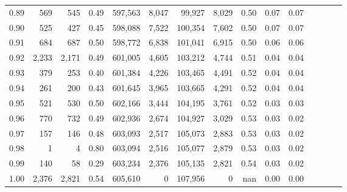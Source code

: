 \begin{tabular}{rrrcrrrrrrrrrrr}
0.89 &     569 &    545 &                                       0.49 &  597,563 &    8,047 &   99,927 &    8,029 &  0.50 &  0.07 &                         0.07 \\
0.90 &     525 &    427 &                                       0.45 &  598,088 &    7,522 &  100,354 &    7,602 &  0.50 &  0.07 &                         0.07 \\
0.91 &     684 &    687 &                                       0.50 &  598,772 &    6,838 &  101,041 &    6,915 &  0.50 &  0.06 &                         0.06 \\
0.92 &   2,233 &  2,171 &                                       0.49 &  601,005 &    4,605 &  103,212 &    4,744 &  0.51 &  0.04 &                         0.04 \\
0.93 &     379 &    253 &                                       0.40 &  601,384 &    4,226 &  103,465 &    4,491 &  0.52 &  0.04 &                         0.04 \\
0.94 &     261 &    200 &                                       0.43 &  601,645 &    3,965 &  103,665 &    4,291 &  0.52 &  0.04 &                         0.04 \\
0.95 &     521 &    530 &                                       0.50 &  602,166 &    3,444 &  104,195 &    3,761 &  0.52 &  0.03 &                         0.03 \\
0.96 &     770 &    732 &                                       0.49 &  602,936 &    2,674 &  104,927 &    3,029 &  0.53 &  0.03 &                         0.02 \\
0.97 &     157 &    146 &                                       0.48 &  603,093 &    2,517 &  105,073 &    2,883 &  0.53 &  0.03 &                         0.02 \\
0.98 &       1 &      4 &                                       0.80 &  603,094 &    2,516 &  105,077 &    2,879 &  0.53 &  0.03 &                         0.02 \\
0.99 &     140 &     58 &                                       0.29 &  603,234 &    2,376 &  105,135 &    2,821 &  0.54 &  0.03 &                         0.02 \\
1.00 &   2,376 &  2,821 &                                       0.54 &  605,610 &        0 &  107,956 &        0 &   nan &  0.00 &                         0.00 \\
\bottomrule
\end{tabular}
